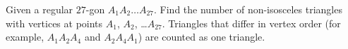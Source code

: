 Given a regular $27$-gon $A_{1} A_{2}\ldots A_{27}$. Find the number of non-isosceles triangles with vertices at points $A_{1}$, $A_{2}$, \ldots $A_{27}$. Triangles that differ in vertex order (for example, $A_{1}A_{2}A_{4}$ and $A_{2}A_{4}A_{1}$) are counted as one triangle.

